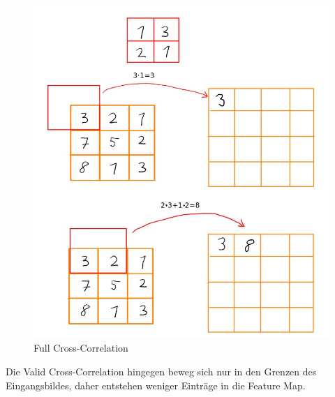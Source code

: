 \documentclass[12pt]{article}
\begin{document}
\begin{figure}[H]
\centering
\includegraphics[scale=0.5]{./Images/Full_Correlation_004.jpg}
\caption{Full Cross-Correlation}
\label{Full Cross-Correlation}
\end{figure}
 
Die Valid Cross-Correlation hingegen beweg sich nur in den Grenzen des Eingangsbildes, daher entstehen weniger Einträge in die Feature Map.
\end{document}
